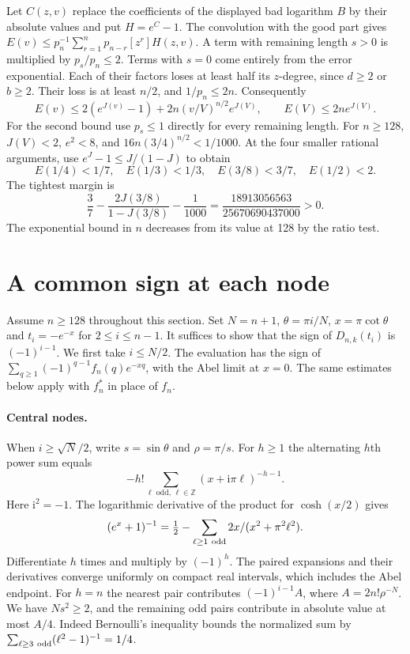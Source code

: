 \documentclass[11pt]{article}
\begin{document}
Let $C(z,v)$ replace the coefficients of the displayed bad logarithm $B$ by their absolute values and put $H=e^C-1$. The convolution with the good part gives $E(v)\le p_n^{-1}\sum_{r=1}^n p_{n-r}[z^r]H(z,v)$. A term with remaining length $s>0$ is multiplied by $p_s/p_n\le2$. Terms with $s=0$ come entirely from the error exponential. Each of their factors loses at least half its $z$-degree, since $d\ge2$ or $b\ge2$. Their loss is at least $n/2$, and $1/p_n\le2n$. Consequently
\[
 E(v)\le 2(e^{J(v)}-1)+2n(v/V)^{n/2}e^{J(V)},\qquad E(V)\le2n e^{J(V)}.
\]
For the second bound use $p_s\le1$ directly for every remaining length. For $n\ge128$, $J(V)<2$, $e^2<8$, and $16n(3/4)^{n/2}<1/1000$. At the four smaller rational arguments, use $e^J-1\le J/(1-J)$ to obtain
\begin{equation}\label{est}
 E(1/4)<1/7,\quad E(1/3)<1/3,\quad E(3/8)<3/7,\quad E(1/2)<2 .
\end{equation}
The tightest margin is \[ \frac37-\frac{2J(3/8)}{1-J(3/8)}-\frac1{1000} = \frac{18913056563}{25670690437000}>0. \] The exponential bound in $n$ decreases from its value at 128 by the ratio test.

\section{A common sign at each node}
Assume $n\ge128$ throughout this section. Set $N=n+1$, $\theta=\pi i/N$, $x=\pi\cot\theta$ and $t_i=-e^{-x}$ for $2\le i\le n-1$. It suffices to show that the sign of $D_{n,k}(t_i)$ is $(-1)^{i-1}$. We first take $i\le N/2$. The evaluation has the sign of
$\sum_{q\ge1}(-1)^{q-1}f_n(q)e^{-xq}$, with the Abel limit at $x=0$. The same estimates below apply with $f_n^*$ in place of $f_n$.

\paragraph{Central nodes.}
When $i\ge\sqrt N/2$, write $s=\sin\theta$ and $\rho=\pi/s$. For $h\ge1$ the alternating $h$th power sum equals
\[
 -h!\sum_{\ell\text{ odd},\,\ell\in\mathbb Z}(x+\mathrm i\pi\ell)^{-h-1}.
\]
Here $\mathrm i^2=-1$. The logarithmic derivative of the product for $\cosh(x/2)$ gives
\[
 (e^x+1)^{-1}=\tfrac12-\sum_{\ell\ge1\ {\rm odd}}2x/(x^2+\pi^2\ell^2).
\]
Differentiate $h$ times and multiply by $(-1)^h$. The paired expansions and their derivatives converge uniformly on compact real intervals, which includes the Abel endpoint.
For $h=n$ the nearest pair contributes $(-1)^{i-1}A$, where $A=2n!\rho^{-N}$. We have $Ns^2\ge2$, and the remaining odd pairs contribute in absolute value at most $A/4$. Indeed Bernoulli's inequality bounds the normalized sum by $\sum_{\ell\ge3\ {\rm odd}}(\ell^2-1)^{-1}=1/4$.
\end{document}
